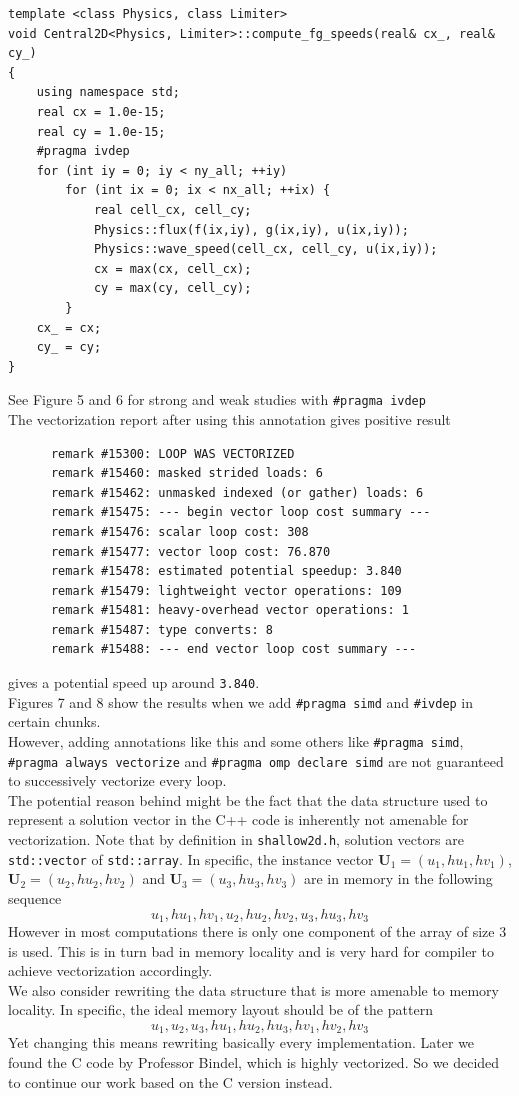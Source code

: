 \documentclass[12pt]{article}
\numberwithin{equation}{section}
\begin{document}
\scriptsize
\begin{lstlisting}
template <class Physics, class Limiter>
void Central2D<Physics, Limiter>::compute_fg_speeds(real& cx_, real& cy_)
{
    using namespace std;
    real cx = 1.0e-15;
    real cy = 1.0e-15;
    #pragma ivdep
    for (int iy = 0; iy < ny_all; ++iy)
        for (int ix = 0; ix < nx_all; ++ix) {
            real cell_cx, cell_cy;
            Physics::flux(f(ix,iy), g(ix,iy), u(ix,iy));
            Physics::wave_speed(cell_cx, cell_cy, u(ix,iy));
            cx = max(cx, cell_cx);
            cy = max(cy, cell_cy);
        }
    cx_ = cx;
    cy_ = cy;
}
\end{lstlisting}
\normalsize
See Figure 5 and 6 for strong and weak studies with \texttt{\#pragma ivdep}
\\
The vectorization report after using this annotation gives positive result

\scriptsize
\begin{lstlisting}
      remark #15300: LOOP WAS VECTORIZED
      remark #15460: masked strided loads: 6
      remark #15462: unmasked indexed (or gather) loads: 6
      remark #15475: --- begin vector loop cost summary ---
      remark #15476: scalar loop cost: 308
      remark #15477: vector loop cost: 76.870
      remark #15478: estimated potential speedup: 3.840
      remark #15479: lightweight vector operations: 109
      remark #15481: heavy-overhead vector operations: 1
      remark #15487: type converts: 8
      remark #15488: --- end vector loop cost summary ---
\end{lstlisting}
\normalsize
gives a potential speed up around \texttt{3.840}.
\\
Figures 7 and 8 show the results when we add \texttt{\#pragma simd} and
\texttt{\#ivdep} in certain chunks.
\\
However, adding annotations like this and some others like \texttt{\#pragma simd},
\texttt{\#pragma always vectorize} and \texttt{\#pragma omp declare simd} are not
guaranteed to successively vectorize every loop.
\\
The potential reason behind might be the fact that the data structure used to represent a solution vector in the C++ code is inherently not amenable for vectorization.
Note that by definition in \texttt{shallow2d.h}, solution vectors are \texttt{std::vector} of \texttt{std::array}. In specific, the instance vector $\mathbf{U}_1 = \left( u_1, hu_1, hv_1  \right)$, $\mathbf{U}_2 = \left( u_2, hu_2, hv_2 \right)$ and $\mathbf{U}_3 = \left( u_3, hu_3, hv_3 \right)$ are in memory in the following sequence
\[
 u_1, hu_1, hv_1, u_2, hu_2, hv_2, u_3, hu_3, hv_3
\]
However in most computations there is only one component of the array of size 3 is used. This is in turn bad in memory locality and is very hard for compiler to achieve
vectorization accordingly.
\\
We also consider rewriting the data structure that is more amenable to memory locality. In specific, the ideal memory layout should be of the pattern
\[
 u_1, u_2, u_3, hu_1, hu_2, hu_3, hv_1, hv_2, hv_3
\]
Yet changing this means rewriting basically every implementation. Later we found
the C code by Professor Bindel, which is highly vectorized. So we decided to
continue our work based on the C version instead.
\end{document}
